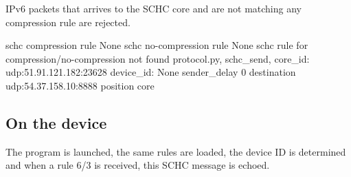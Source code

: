 IPv6 packets that arrives to the SCHC core and are not matching any compression rule are rejected.
\begin{termc}[backgroundcolor=\color{palerod}, basicstyle=\ttfamily\tiny]
schc compression rule None
schc no-compression rule None
schc rule for compression/no-compression not found
protocol.py, schc_send, core_id:  udp:51.91.121.182:23628 device_id:  None sender_delay 0 destination udp:54.37.158.10:8888 position core
\end{termc}

\subsection{On the device}

The program is launched, the same rules are loaded, the device ID is determined and when a rule 6/3 is received, this SCHC message is echoed.

